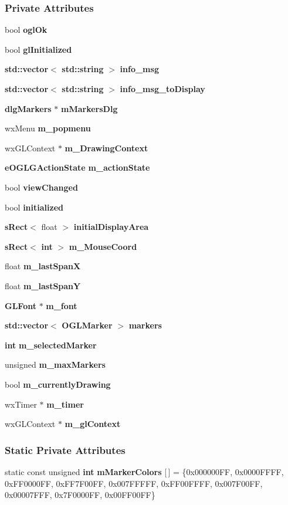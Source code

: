 \subsubsection*{Private Attributes}
\begin{DoxyCompactItemize}
\item 
bool {\bf ogl\+Ok}
\item 
bool {\bf gl\+Initialized}
\item 
{\bf std\+::vector}$<$ {\bf std\+::string} $>$ {\bf info\+\_\+msg}
\item 
{\bf std\+::vector}$<$ {\bf std\+::string} $>$ {\bf info\+\_\+msg\+\_\+to\+Display}
\item 
{\bf dlg\+Markers} $\ast$ {\bf m\+Markers\+Dlg}
\item 
wx\+Menu {\bf m\+\_\+popmenu}
\item 
wx\+G\+L\+Context $\ast$ {\bf m\+\_\+\+Drawing\+Context}
\item 
{\bf e\+O\+G\+L\+G\+Action\+State} {\bf m\+\_\+action\+State}
\item 
bool {\bf view\+Changed}
\item 
bool {\bf initialized}
\item 
{\bf s\+Rect}$<$ float $>$ {\bf initial\+Display\+Area}
\item 
{\bf s\+Rect}$<$ {\bf int} $>$ {\bf m\+\_\+\+Mouse\+Coord}
\item 
float {\bf m\+\_\+last\+SpanX}
\item 
float {\bf m\+\_\+last\+SpanY}
\item 
{\bf G\+L\+Font} $\ast$ {\bf m\+\_\+font}
\item 
{\bf std\+::vector}$<$ {\bf O\+G\+L\+Marker} $>$ {\bf markers}
\item 
{\bf int} {\bf m\+\_\+selected\+Marker}
\item 
unsigned {\bf m\+\_\+max\+Markers}
\item 
bool {\bf m\+\_\+currently\+Drawing}
\item 
wx\+Timer $\ast$ {\bf m\+\_\+timer}
\item 
wx\+G\+L\+Context $\ast$ {\bf m\+\_\+gl\+Context}
\end{DoxyCompactItemize}
\subsubsection*{Static Private Attributes}
\begin{DoxyCompactItemize}
\item 
static const unsigned {\bf int} {\bf m\+Marker\+Colors} [$\,$] = \{0x000000\+F\+F, 0x0000\+F\+F\+F\+F, 0x\+F\+F0000\+F\+F, 0x\+F\+F7\+F00\+F\+F, 0x007\+F\+F\+F\+F\+F, 0x\+F\+F00\+F\+F\+F\+F, 0x007\+F00\+F\+F, 0x00007\+F\+F\+F, 0x7\+F0000\+F\+F, 0x00\+F\+F00\+F\+F\}
\end{DoxyCompactItemize}
